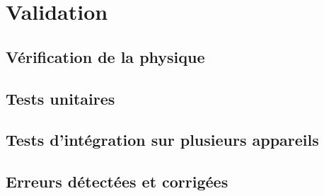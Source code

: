 
\chapter{Validation}\label{chap:validation}

\section{Vérification de la physique}

\section{Tests unitaires}

\section{Tests d'intégration sur plusieurs appareils}

\section{Erreurs détectées et corrigées}
